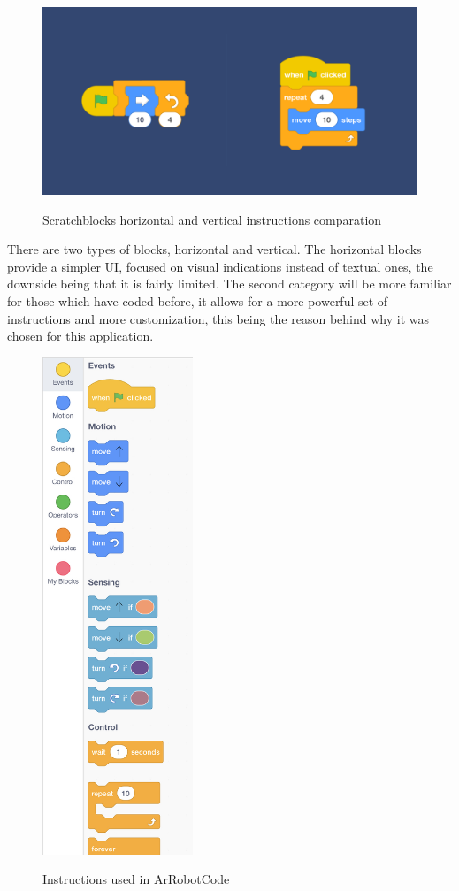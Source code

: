 \documentclass[12 pct]{report}
\begin{document}
\begin{figure}[H]
\includegraphics[width=1.0\textwidth]{scratchblocks}
\centering
\label{fig:hololens}
\caption{Scratchblocks horizontal and vertical instructions comparation}
\end{figure}

There are two types of blocks, horizontal and vertical. The horizontal blocks provide a simpler UI, focused on visual indications instead of textual ones, the downside being that it is fairly limited. The second category will be more familiar for those which have coded before, it allows for a more powerful set of instructions and more customization, this being the reason behind why it was chosen for this application.

\begin{figure}[H]
\includegraphics[width=0.4\textwidth]{allInstructions}
\centering
\label{fig:hololens}
\caption{Instructions used in ArRobotCode}
\end{figure}
\end{document}

